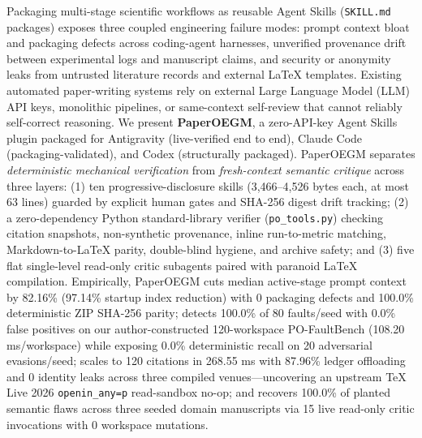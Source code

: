 Packaging multi-stage scientific workflows as reusable Agent Skills (\texttt{SKILL.\allowbreak{}md} packages) exposes three coupled engineering failure modes: prompt context bloat and packaging defects across coding-agent harnesses, unverified provenance drift between experimental logs and manuscript claims, and security or anonymity leaks from untrusted literature records and external LaTeX templates. Existing automated paper-writing systems rely on external Large Language Model (LLM) API keys, monolithic pipelines, or same-context self-review that cannot reliably self-correct reasoning. We present \textbf{PaperOEGM}, a zero-API-key Agent Skills plugin packaged for Antigravity (live-verified end to end), Claude Code (packaging-validated), and Codex (structurally packaged). PaperOEGM separates \emph{deterministic mechanical verification} from \emph{fresh-context semantic critique} across three layers: (1) ten progressive-disclosure skills (3,466--4,526 bytes each, at most 63 lines) guarded by explicit human gates and SHA-256 digest drift tracking; (2) a zero-dependency Python standard-library verifier (\texttt{po\_\allowbreak{}tools.\allowbreak{}py}) checking citation snapshots, non-synthetic provenance, inline run-to-metric matching, Markdown-to-LaTeX parity, double-blind hygiene, and archive safety; and (3) five flat single-level read-only critic subagents paired with paranoid LaTeX compilation. Empirically, PaperOEGM cuts median active-stage prompt context by 82.16\% (97.14\% startup index reduction) with 0 packaging defects and 100.0\% deterministic ZIP SHA-256 parity; detects 100.0\% of 80 faults/seed with 0.0\% false positives on our author-constructed 120-workspace PO-FaultBench (108.20 ms/workspace) while exposing 0.0\% deterministic recall on 20 adversarial evasions/seed; scales to 120 citations in 268.55 ms with 87.96\% ledger offloading and 0 identity leaks across three compiled venues---uncovering an upstream TeX Live 2026 \texttt{openin\_\allowbreak{}any=p} read-sandbox no-op; and recovers 100.0\% of planted semantic flaws across three seeded domain manuscripts via 15 live read-only critic invocations with 0 workspace mutations.
